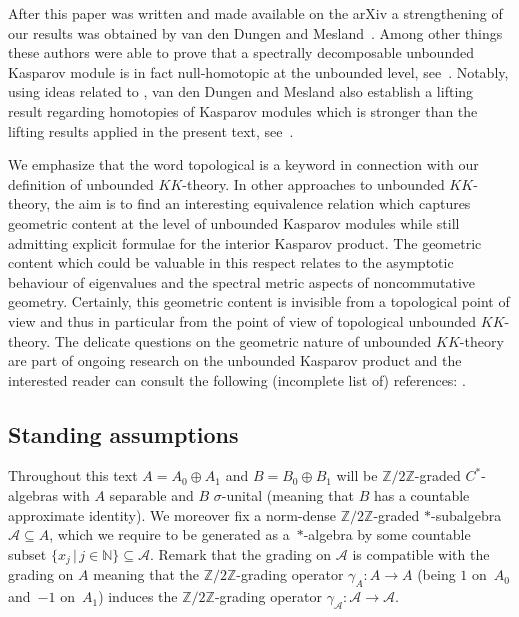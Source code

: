 \documentclass[pdftex]{sigma}
\numberwithin{equation}{section}
\newcommand{\op}{\oplus}
\newcommand{\nn}{\mathbb{N}}
\newcommand{\zz}{\mathbb{Z}}
\newcommand{\ga}{\gamma}
\newcommand{\si}{\sigma}
\newcommand{\s}[1]{\mathscr{#1}}
\newcommand{\su}{\subseteq}
\begin{document}
After this paper was written and made available on the arXiv a strengthening of our results was obtained by van den Dungen and Mesland~\cite{DuMe:HEU}. Among other things these authors were able to prove that a spectrally decomposable unbounded Kasparov module is in fact null-homotopic at the unbounded level, see~\cite[Corollary~4.9]{DuMe:HEU}. Notably, using ideas related to \cite{BaJu:TBK,Kuc:LIK,MeRe:NST}, van den Dungen and Mesland also establish a lifting result regarding homotopies of Kasparov modules which is stronger than the lifting results applied in the present text, see~\cite[Theorem~2.9]{DuMe:HEU}.

We emphasize that the word topological is a keyword in connection with our definition of unbounded $KK$-theory. In other approaches to unbounded $KK$-theory, the aim is to find an interesting equivalence relation which captures geometric content at the level of unbounded Kasparov modules while still admitting explicit formulae for the interior Kasparov product. The geometric content which could be valuable in this respect relates to the asymptotic behaviour of eigenvalues and the spectral metric aspects of noncommutative geometry. Certainly, this geometric content is invisible from a topological point of view and thus in particular from the point of view of topological unbounded $KK$-theory. The delicate questions on the geometric nature of unbounded $KK$-theory are part of ongoing research on the unbounded Kasparov product and the interested reader can consult the following (incomplete list of) references: \cite{BrMeSu:GSU,Kaa:MEU,KaLe:SFU,KaSu:FDT, Kuc:PUM,Kuc:LIK,Mes:UCN,MeRe:NST}.

\subsection{Standing assumptions} Throughout this text $A = A_0 \op A_1$ and $B = B_0 \op B_1$ will be $\zz/2\zz$-graded $C^*$-algebras with $A$ separable and $B$ $\si$-unital (meaning that $B$ has a countable approximate identity). We moreover fix a norm-dense $\zz/2\zz$-graded $*$-subalgebra $\s A \su A$, which we require to be generated as a~$*$-algebra by some countable subset $\{ x_j \,|\, j \in \nn \} \su \s A$. Remark that the grading on $\s A$ is compatible with the grading on $A$ meaning that the $\zz/2\zz$-grading operator $\ga_A \colon A \to A$ (being $1$ on~$A_0$ and~$-1$ on~$A_1$) induces the $\zz/2\zz$-grading operator $\ga_{\s A} \colon \s A \to \s A$.
\end{document}
